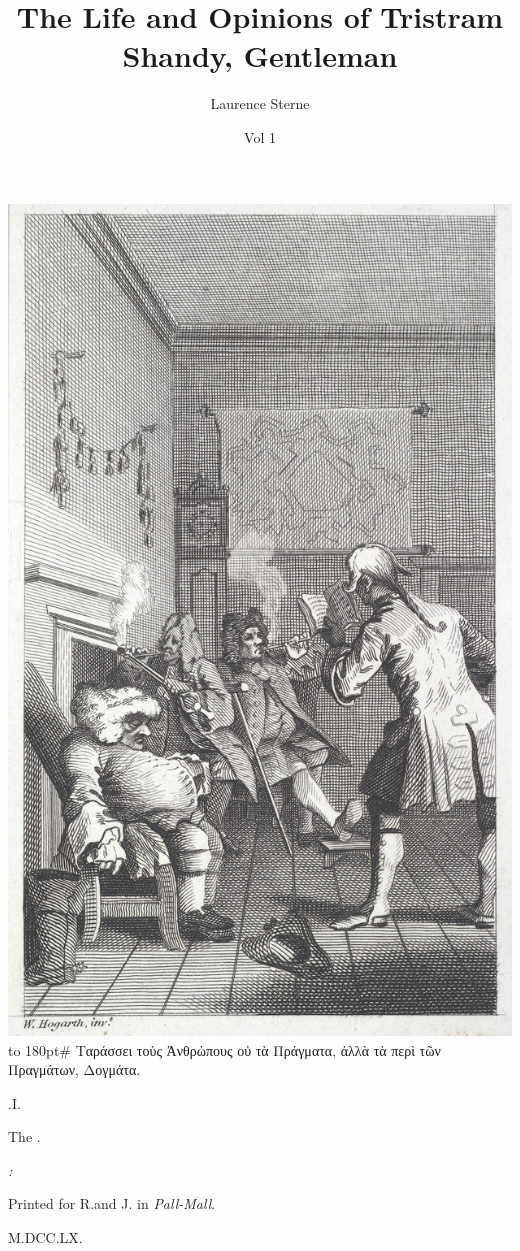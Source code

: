 \documentclass[twoside]{article}
\title{The Life and Opinions of Tristram Shandy, Gentleman}
\author{Laurence Sterne}
\date{Vol 1}
\begin{document}
\pagestyle{empty}
\null\newpage\noindent
\includegraphics[width=\textwidth]{hogarth-front-1}
\newpage
\vbox{\openup 10pt}
\vfill
\vbox{\openup -2pt\halign to 180pt{\footnotesize #\cr
\quad Ταράσσει τοὺς Ἀνθρὠπους οὐ τὰ Πράγματα,\cr
ἀλλὰ τὰ περὶ τῶν Πραγμάτων, Δογμάτα.\hfill\cr}}
\vfill
\centerline{.\quad I.}
\smallskip
\centerline{The\kern 5pt .}
\vfill
\centerline{\itshape{}:}
\centerline{\smaller Printed for R.\@ and J.\@ {} in \textit{Pall-Mall}.}
\centerline{M.DCC.LX.}
\end{document}
